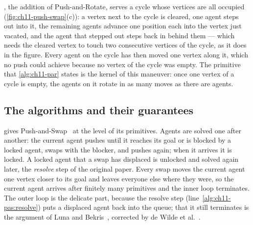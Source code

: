 \PasRotate, the addition of Push-and-Rotate, serves a cycle whose vertices
are all occupied (\cref{fig:ch11-push-swap}(c)): a vertex next to the cycle
is cleared, one agent steps out into it, the remaining agents advance one
position each into the vertex just vacated, and the agent that stepped out
steps back in behind them --- which needs the cleared vertex to touch two
consecutive vertices of the cycle, as it does in the figure. Every agent on
the cycle has then moved one vertex along it, which no push could achieve
because no vertex of the cycle was empty. The primitive that
\cref{alg:ch11-par} states is the kernel of this maneuver: once one vertex
of a cycle is empty, the agents on it rotate in as many moves as there are
agents.

\subsection{The algorithms and their guarantees}

 gives Push-and-Swap~\cite{luna2011push} at the level of
its primitives. Agents are solved one after another: the current agent
pushes until it reaches its goal or is blocked by a locked agent, swaps
with the blocker, and pushes again; when it arrives it is locked. A locked
agent that a swap has displaced is unlocked and solved again later, the
\emph{resolve} step of the original paper. Every swap moves the current
agent one vertex closer to its goal and leaves everyone else where they
were, so the current agent arrives after finitely many primitives and the
inner loop terminates. The outer loop is the delicate part, because the
resolve step (line~\ref{alg:ch11-pas:resolve}) puts a displaced agent back
into the queue; that it still terminates is the argument of Luna and
Bekris~\cite{luna2011push}, corrected by de Wilde et
al.~\cite{dewilde2014push}.

\begin{algorithm}[!htb]
\caption{Push-and-Swap (conceptual)}
\label{alg:ch11-pas}
\end{algorithm}

